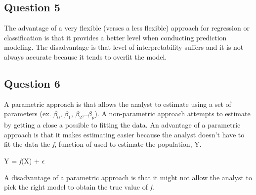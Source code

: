 \documentclass{article}
\begin{document}
\subsection*{Question 5}
The advantage of a very flexible (verses a less flexible) approach for regression or classification is that it provides a better
level when conducting prediction modeling. The disadvantage is that level of interpretability suffers and it is not always accurate because it tends to overfit the model.

\subsection*{Question 6}
A parametric approach is that allows the analyst to estimate using a set of parameters (ex. $\beta_{0}$, $\beta_{1}$,
$\beta_{2}$,..$\beta_{p}$). A non-parametric approach attempts to estimate by getting a close a possible to fitting the data. 
An advantage of a parametric approach is that it makes estimating easier because the analyst doesn't have to fit the data the \textit{f}, function of used to estimate the population, Y.  \newline
\begin{center}
Y = \textit{f}(X) + $\epsilon$ 
\end{center}
A disadvantage of a parametric approach is that it might not allow the analyst to pick the right model to obtain the true value of \textit{f}.
\end{document}
